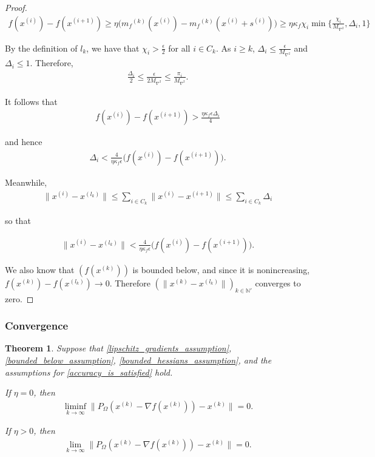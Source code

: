 \documentclass{article}
\newtheorem{theorem}{Theorem}[section]
\theoremstyle{case}
\newcommand{\maxhessian}{{M_{\nabla^2}}}
\newcommand{\xk}{{x^{(k)}}}
\newcommand{\naturals}{\mathbb N}
\newcommand{\mfk}{{{m}_f}^{(k)}}
\newcommand{\gradf}{\nabla f}
\begin{document}
\begin{proof}
\begin{align}
f(x^{(i)}) - f(x^{(i+1)}) \ge \eta\big ( \mfk(x^{(i)}) - \mfk(x^{(i)} + s^{(i)}) \big ) \ge \eta \kappa_f \chi_i \min\{\frac{\chi_{i}}{\maxhessian}, \Delta_i, 1\} 
\end{align}

By the definition of $l_k$, we have that $\chi_i > \frac{\epsilon}{2}$ for all $i \in C_k$.
As $i \ge k$, $\Delta_i \le \frac{\epsilon}{\maxhessian}$ and $\Delta_i \le 1$.
Therefore,
\begin{align}
\frac{\Delta_i}{2} \le \frac{\epsilon}{2 \maxhessian} \le \frac{\pi_i}{\maxhessian}.
\end{align}

It follows that
\begin{align}
f(x^{(i)}) - f(x^{(i+1)}) > \frac{\eta \kappa_f \epsilon \Delta_i}{4}
\end{align}

and hence
\begin{align}
\Delta_i < \frac{4}{\eta \kappa_f \epsilon} \big ( f(x^{(i)}) - f(x^{(i+1)})\big ).
\end{align}

Meanwhile,
\begin{align}
\|x^{(i)} - x^{(l_k)}\| \le \sum_{i \in C_k}\|x^{(i)} - x^{(i+1)}\| \le \sum_{i \in C_k} \Delta_i
\end{align}

so that

\begin{align}
\|x^{(i)} - x^{(l_k)}\| < \frac{4}{\eta \kappa_f \epsilon} \big ( f(x^{(i)}) - f(x^{(i+1)})\big ).
\end{align}

We also know that $(f(\xk))$ is bounded below, and since it is nonincreasing, $f(\xk)  - f(x^{(l_k)}) \to 0$.
Therefore $(\|\xk - x^{(l_k)}\|)_{k \in \naturals '}$ converges to zero.
\end{proof}

\subsubsection{Convergence}

\begin{theorem}
\label{the_convergence_theorem}
Suppose that \cref{lipschitz_gradients_assumption}, \cref{bounded_below_assumption}, \cref{bounded_hessians_assumption}, and 
the assumptions for \cref{accuracy_is_satisfied} hold.

If $\eta = 0$, then
\begin{align}
\liminf_{k\to\infty} \|P_{\Omega}(\xk - \gradf(\xk)) - \xk \| = 0.
\end{align}

If $\eta > 0$, then
\begin{align}
\lim_{k\to\infty} \|P_{\Omega}(\xk - \gradf(\xk)) - \xk \| = 0.
\end{align}

\end{theorem}
\end{document}
